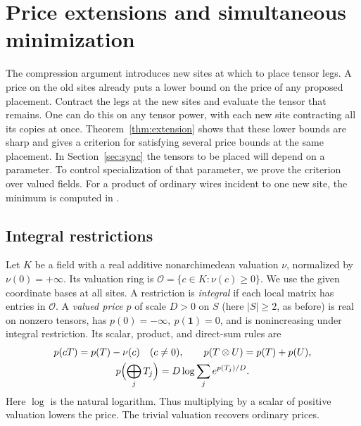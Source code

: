 \section{Price extensions and simultaneous minimization}\label{sec:prices}

The compression argument introduces new sites at which to place tensor
legs. A price on the old sites already puts a lower bound on the price
of any proposed placement. Contract the legs at the new sites and
evaluate the tensor that remains. One can do this on any tensor power,
with each new site contracting all its copies at once.
Theorem~\ref{thm:extension} shows that these lower bounds are sharp and
gives a criterion for satisfying several price bounds at the same
placement. In Section~\ref{sec:sync} the tensors to be placed will
depend on a parameter. To control specialization of that parameter,
we prove the criterion over valued fields. For a product of ordinary
wires incident to one new site, the minimum is computed in
\cite[Theorem~]{oaG}.

\subsection{Integral restrictions}
Let \(K\) be a field with a real additive nonarchimedean valuation
\(\nu\), normalized by \(\nu(0)=+\infty\). Its valuation ring is
\(\mathcal O=\{c\in K:\nu(c)\ge0\}\). We use the given coordinate bases
at all sites. A restriction is \emph{integral} if each local matrix has
entries in \(\mathcal O\). A \emph{valued price} \(p\) of scale \(D>0\) on \(S\)
(here $|S|\ge2$, as before) is real on nonzero tensors, has \(p(0)=-\infty,\ p(\mathbf1)=0\), and
is nonincreasing under integral restriction. Its scalar, product, and
direct-sum rules are
\begin{equation}\label{eq:prices-axioms}
 \begin{gathered}
 p(cT)=p(T)-\nu(c) \quad(c\ne0), \qquad
 p(T\otimes U)=p(T)+p(U),\\
 p\Bigl(\bigoplus_j T_j\Bigr)=D\log\sum_j e^{p(T_j)/D}.
 \end{gathered}
\end{equation}
Here \(\log\) is the natural logarithm. Thus multiplying by a scalar of
positive valuation lowers the price. The trivial valuation recovers
ordinary prices.

